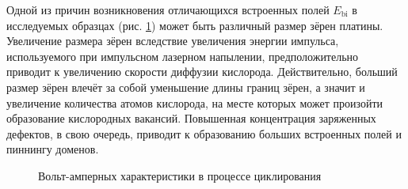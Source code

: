 Одной из причин возникновения отличающихся встроенных полей \(E_\text{bi}\) в исследуемых образцах (рис. \ref{fig:probe_station:pq}) может быть различный размер зёрен платины. Увеличение размера зёрен вследствие увеличения энергии импульса, используемого при импульсном лазерном напылении, предположительно приводит к увеличению скорости диффузии кислорода. Действительно, больший размер зёрен влечёт за собой уменьшение длины границ зёрен, а значит и увеличение количества атомов кислорода, на месте которых может произойти образование кислородных вакансий. Повышенная концентрация заряженных дефектов, в свою очередь, приводит к образованию больших встроенных полей и пиннингу доменов.

\begin{figure}[ht]
    \caption[Этот текст попадает в названия рисунков в списке рисунков]{Вольт-амперных характеристики в процессе циклирования}\label{fig:probe_station:pq}
\end{figure}






